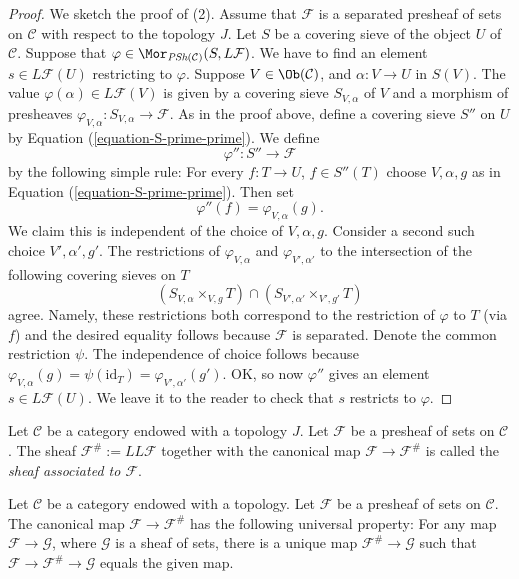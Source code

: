 \begin{proof}
\medskip\noindent
We sketch the proof of (2). Assume that $\mathcal{F}$ is a
separated presheaf of sets on $\mathcal{C}$ with respect to
the topology $J$.
Let $S$ be a covering sieve of the object $U$ of $\mathcal{C}$.
Suppose that $\varphi \in \Mor_{\textit{PSh}(\mathcal{C})}(S, L\mathcal{F})$.
We have to find an element $s \in L\mathcal{F}(U)$ restricting
to $\varphi$. Suppose $V\in \Ob(\mathcal{C})$, and
$\alpha : V \to U$ in $S(V)$. The value $\varphi(\alpha)
\in L\mathcal{F}(V)$ is given by a covering sieve
$S_{V, \alpha}$ of $V$ and a morphism of presheaves
$\varphi_{V, \alpha} : S_{V, \alpha} \to \mathcal{F}$.
As in the proof above, define a covering sieve $S''$ on $U$ by
Equation (\ref{equation-S-prime-prime}). We define
$$
\varphi'' : S'' \longrightarrow \mathcal{F}
$$
by the following simple rule: For every $f : T \to U$,
$f \in S''(T)$ choose $V, \alpha, g$ as in
Equation (\ref{equation-S-prime-prime}). Then set
$$
\varphi''(f) = \varphi_{V, \alpha}(g).
$$
We claim this is independent of the
choice of $V, \alpha, g$.
Consider a second such choice $V', \alpha', g'$.
The restrictions of $\varphi_{V, \alpha}$ and
$\varphi_{V', \alpha'}$ to the intersection
of the following covering sieves on $T$
$$
(S_{V, \alpha} \times_{V, g} T) \cap (S_{V', \alpha'} \times_{V', g'} T)
$$
agree. Namely, these restrictions both correspond to the
restriction of $\varphi$ to $T$ (via $f$) and the desired
equality follows because $\mathcal{F}$ is separated.
Denote the common restriction $\psi$.
The independence of choice follows because
$\varphi_{V, \alpha}(g) = \psi(\text{id}_T) =
\varphi_{V', \alpha'}(g')$. OK, so now $\varphi''$
gives an element $s \in L\mathcal{F}(U)$. We leave it to
the reader to check that $s$ restricts to $\varphi$.
\end{proof}

\begin{definition}
\label{definition-associated-sheaf-topology}
Let $\mathcal{C}$ be a category endowed with a topology $J$.
Let $\mathcal{F}$ be a presheaf of sets on $\mathcal{C}$.
The sheaf $\mathcal{F}^\# := LL\mathcal{F}$
together with the canonical map $\mathcal{F} \to \mathcal{F}^\#$
is called the {\it sheaf associated to $\mathcal{F}$}.
\end{definition}

\begin{proposition}
\label{proposition-sheafification-adjoint-topology}
Let $\mathcal{C}$ be a category endowed with a topology.
Let $\mathcal{F}$ be a presheaf of sets on $\mathcal{C}$.
The canonical map $\mathcal{F} \to \mathcal{F}^\#$ has the
following universal property: For any map
$\mathcal{F} \to \mathcal{G}$,
where $\mathcal{G}$ is a sheaf of sets, there is a unique map
$\mathcal{F}^\# \to \mathcal{G}$ such that $\mathcal{F} \to \mathcal{F}^\#
\to \mathcal{G}$ equals the given map.
\end{proposition}

